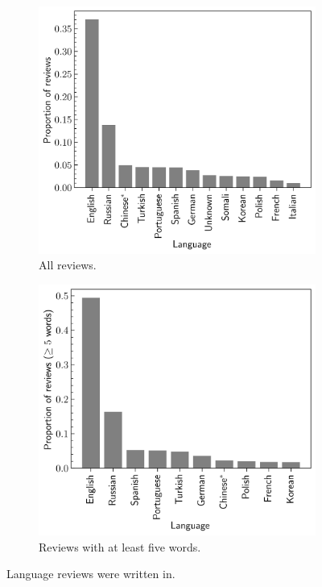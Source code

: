 \begin{figure}[ht]
    \centering
    \begin{subfigure}[ht]{0.49\textwidth}
        \centering
        \includegraphics[width=\textwidth]{figures/03_dataset/12_bars_review_langs_min0.png}
        \caption{All reviews.}
        \label{fig:Dataset_BarsLangsMin1}
    \end{subfigure}
    \hfill
    \begin{subfigure}[ht]{0.49\textwidth}
        \centering
        \includegraphics[width=\textwidth]{figures/03_dataset/13_bars_review_langs_min5.png}
        \caption{Reviews with at least five words.}
        \label{fig:Dataset_BarsLangsMin5}
    \end{subfigure}
    \caption{Language reviews were written in.}
    \label{fig:Dataset_BarsLangs}
\end{figure}

